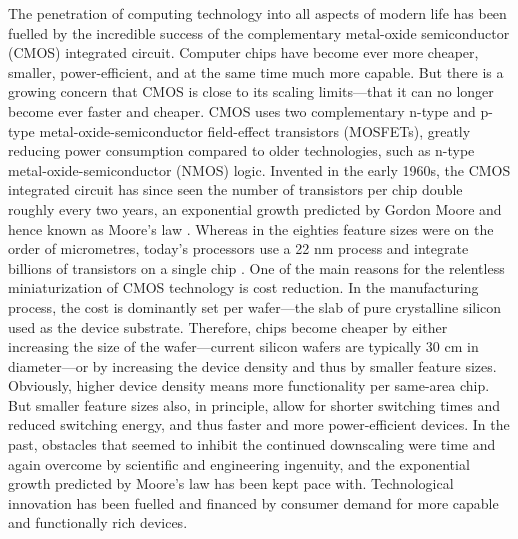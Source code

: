 The penetration of computing technology into all aspects of modern life has been
fuelled by the incredible success of the complementary metal-oxide semiconductor
(CMOS) integrated circuit. Computer chips have become ever more cheaper,
smaller, power-efficient, and at the same time much more capable. But there is a
growing concern that CMOS is close to its scaling limits---that it can no longer
become ever faster and cheaper. CMOS uses two complementary n-type and p-type
metal-oxide-semiconductor field-effect transistors (MOSFETs), greatly reducing
power consumption compared to older technologies, such as n-type
metal-oxide-semiconductor (NMOS) logic. Invented in the early 1960s, the CMOS
integrated circuit has since seen the number of transistors per chip double
roughly every two years, an exponential growth predicted by Gordon Moore and
hence known as Moore's law \cite{moore1965cramming}. Whereas in the eighties
feature sizes were on the order of micrometres, today's processors use a 22 nm
process and integrate billions of transistors on a single chip
\cite{bohr2011evolution}. One of the main reasons for the relentless
miniaturization of CMOS technology is cost reduction. In the manufacturing
process, the cost is dominantly set per wafer---the slab of pure crystalline
silicon used as the device substrate.  Therefore, chips become cheaper by either
increasing the size of the wafer---current silicon wafers are typically 30 cm in
diameter---or by increasing the device density and thus by smaller feature
sizes. Obviously, higher device density means more functionality per same-area
chip. But smaller feature sizes also, in principle, allow for shorter switching
times and reduced switching energy, and thus faster and more power-efficient
devices. In the past, obstacles that seemed to inhibit the continued downscaling
were time and again overcome by scientific and engineering ingenuity, and the
exponential growth predicted by Moore's law has been kept pace with.
Technological innovation has been fuelled and financed by consumer demand for
more capable and functionally rich devices.

